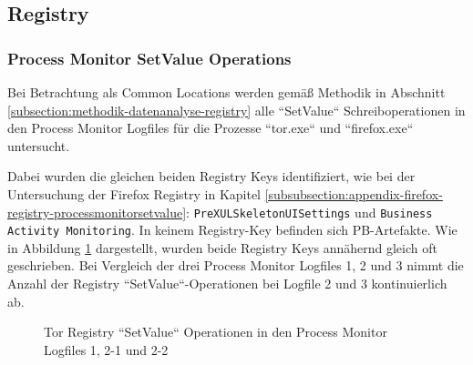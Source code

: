 \begin{appendices}
\subsection{Registry}

\subsubsection*{Process Monitor SetValue Operations}

Bei Betrachtung als Common Locations werden gemäß Methodik in Abschnitt \ref{subsection:methodik-datenanalyse-registry} alle ``SetValue`` Schreiboperationen in den Process Monitor Logfiles für die Prozesse ``tor.exe`` und ``firefox.exe`` untersucht. 

Dabei wurden die gleichen beiden Registry Keys identifiziert, wie bei der Untersuchung der Firefox Registry in Kapitel \ref{subsubsection:appendix-firefox-registry-processmonitorsetvalue}: \texttt{PreXULSkeletonUISettings} und \texttt{Business Activity Monitoring}. In keinem Registry-Key befinden sich PB-Artefakte.
Wie in Abbildung \ref{chart:tor-registy-css-vs-bam} dargestellt, wurden beide Registry Keys annähernd gleich oft geschrieben. Bei Vergleich der drei Process Monitor Logfiles 1, 2 und 3 nimmt die Anzahl der Registry ``SetValue``-Operationen bei Logfile 2 und 3 kontinuierlich ab.

\begin{figure}[h!]
	\caption{Tor Registry ``SetValue`` Operationen in den Process Monitor Logfiles 1, 2-1 und 2-2}
	\label{chart:tor-registy-css-vs-bam}
\end{figure}


\end{appendices}
